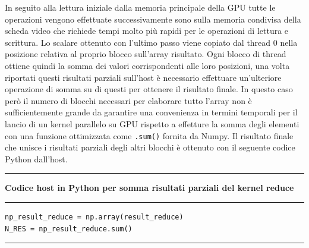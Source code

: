 \documentclass[12pt,a4paper]{report}
\begin{document}
In seguito alla lettura iniziale dalla memoria principale della GPU tutte le operazioni vengono effettuate successivamente sono sulla memoria condivisa della scheda video che richiede tempi molto più rapidi per le operazioni di lettura e scrittura. \newline
Lo scalare ottenuto con l'ultimo passo viene copiato dal thread 0 nella posizione relativa al proprio blocco sull'array risultato. 
Ogni blocco di thread ottiene quindi la somma dei valori corrispondenti alle loro posizioni, una volta riportati questi risultati parziali sull'host è necessario effettuare un'ulteriore operazione di somma su di questi per ottenere il risultato finale. In questo caso però il numero di blocchi necessari per elaborare tutto l'array non è sufficientemente grande da garantire una convenienza in termini temporali per il lancio di un kernel parallelo su GPU rispetto a effetture la somma degli elementi con una funzione ottimizzata come \verb|.sum()| fornita da Numpy. \newline
Il risultato finale che unisce i risultati parziali degli altri blocchi è ottenuto con il seguente codice Python dall'host. \\[10pt]
\noindent\rule[0.5ex]{\linewidth}{2pt}
\small{\textbf{Codice host in Python per somma risultati parziali del kernel reduce}} \\
\noindent\rule[0.5ex]{\linewidth}{1pt}
\begin{lstlisting}
np_result_reduce = np.array(result_reduce) 
N_RES = np_result_reduce.sum()
\end{lstlisting}
\noindent\rule[0.5ex]{\linewidth}{1pt} \\[10pt]
\end{document}
